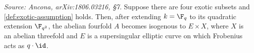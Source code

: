 \begin{lemma}
  \label{lem:exotic-supersingular}
  \textit{Source: Ancona, arXiv:1806.03216, §7.}
  Suppose there are four exotic subsets and \cref{def:exotic-assumption} holds.
  Then, after extending \(k = \F_q\) to its quadratic extension \(\F_{q^2}\), the
  abelian fourfold \(A\) becomes isogenous to \(E \times X\), where \(X\) is an
  abelian threefold and \(E\) is a supersingular elliptic curve on which
  Frobenius acts as \(q \cdot \id\).
\end{lemma}

